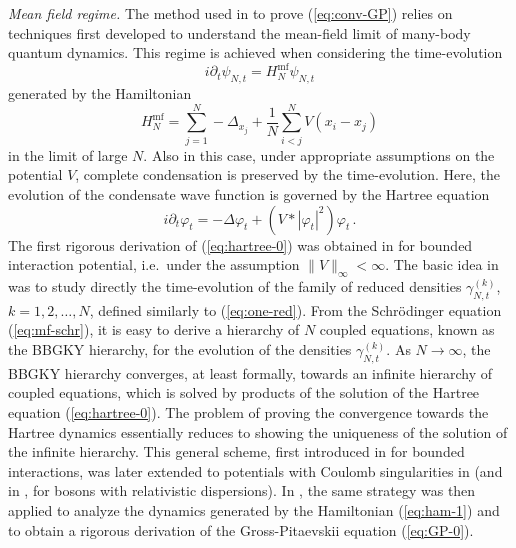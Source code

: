 \documentclass[11pt,a4paper]{article}
\begin{document}
\bigskip

{\it Mean field regime.} The method used in \cite{ESY0,ESY1,ESY2,ESY3,ESY4} 
to prove (\ref{eq:conv-GP}) relies on techniques first developed to understand the mean-field limit of many-body quantum dynamics. This regime is achieved when considering the time-evolution 
\begin{equation}\label{eq:mf-schr}
i\partial_t \psi_{N,t} = H_N^{\text{mf}} \psi_{N,t} 
\end{equation}
generated by the Hamiltonian
\begin{equation}\label{eq:ham-mf} H_N^{\text{mf}} = \sum_{j=1}^N -\Delta_{x_j} + \frac{1}{N} \sum_{i<j}^N V (x_i -x_j) \end{equation}
in the limit of large $N$. Also in this case, under appropriate assumptions on the potential $V$, 
complete condensation is preserved by the time-evolution. Here, the evolution of the condensate wave function is governed by the Hartree equation
\begin{equation}\label{eq:hartree-0} i\partial_t \varphi_t = -\Delta \varphi_t + \left( V * |\varphi_t|^2\right) \varphi_t \,. \end{equation}
The first rigorous derivation of (\ref{eq:hartree-0}) was obtained in \cite{S} for bounded interaction potential, i.e.\ under the assumption $\| V \|_\infty < \infty$. The basic idea in \cite{S} was to study directly the time-evolution of the family of reduced densities $\gamma^{(k)}_{N,t}$, $k =1 ,2, \dots , N$, defined similarly to (\ref{eq:one-red}).  {F}rom the Schr\"odinger equation (\ref{eq:mf-schr}), it is easy to derive a hierarchy of $N$ coupled equations, known as the BBGKY hierarchy, for the evolution of the densities $\gamma^{(k)}_{N,t}$. As $N \to \infty$, the BBGKY hierarchy converges, at least formally, towards an infinite hierarchy of coupled equations, which is solved by products of the solution of the Hartree equation (\ref{eq:hartree-0}). The problem of proving the convergence towards the Hartree dynamics essentially reduces to showing the uniqueness of the solution of the infinite hierarchy. This general scheme, first introduced in \cite{S} for bounded interactions, was later extended to potentials with Coulomb singularities in \cite{EY} (and in \cite{ES}, for bosons with relativistic dispersions). In \cite{ESY1,ESY2,ESY3,ESY4}, the same strategy was then applied to analyze the dynamics generated by the Hamiltonian (\ref{eq:ham-1}) and to obtain a rigorous derivation of the Gross-Pitaevskii equation (\ref{eq:GP-0}). 
\end{document}
